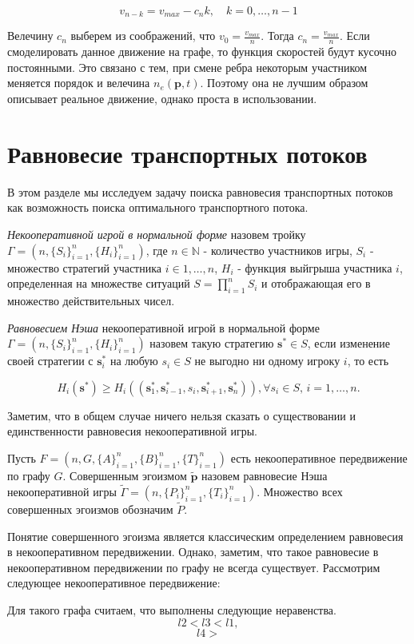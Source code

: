 \documentclass[12pt, a4paper]{article}
\begin{document}
$$v_{n - k} = v_{max} - c_n k, \quad k = 0, \dots, n - 1$$

Велечину $c_n$ выберем из соображений, что $v_0 = \frac{v_{max}}{n}$. Тогда $c_n = \frac{v_{max}}{n}$. Если смоделировать данное движение на графе, то функция скоростей будут кусочно постоянными. Это связано с тем, при смене ребра некоторым участником меняется порядок и велечина $n_e(\textbf{p}, t)$. Поэтому она не лучшим образом описывает реальное движение, однако проста в использовании.

\section{Равновесие транспортных потоков}
В этом разделе мы исследуем задачу поиска равновесия транспортных потоков как возможность поиска оптимального транспортного потока.

\textit{Некооперативной игрой в нормальной форме} назовем тройку $\Gamma = (n, \{S_i\}_{i = 1}^n, \{H_i\}_{i = 1}^n)$, где $n \in \mathbb{N}$ - количество участников игры, $S_i$ - множество стратегий участника $i \in {1, \dots, n}$, $H_i$ - функция выйгрыша участника $i$, определенная на множестве ситуаций $S = \prod\limits_{i = 1}^n S_i$ и отображающая его в множество действительных чисел.

\textit{Равновесием Нэша} некооперативной игрой в нормальной форме $\Gamma = (n, \{S_i\}_{i = 1}^n, \{H_i\}_{i = 1}^n)$ назовем такую стратегию $\textbf{s}^* \in S$, если изменение своей стратегии с $\textbf{s}_i^*$ на любую $s_i \in S$ не выгодно ни одному игроку $i$, то есть

$$H_i(\textbf{s}^*) \ge H_i(\left(\textbf{s}^*_1, \textbf{s}^*_{i - 1}, s_i, \textbf{s}^*_{i + 1}, \textbf{s}^*_{n} \right)), \forall s_i \in S, \, i = 1, \dots, n. $$ 

Заметим, что в общем случае ничего нельзя сказать о существовании и единственности равновесия некооперативной игры.

Пусть $F = (n, G, \{A\}_{i = 1}^{n}, \{B\}_{i = 1}^{n}, \{T\}_{i = 1}^{n})$ есть некооперативное передвижение по графу $G$. Совершенным эгоизмом $\widetilde{\textbf{p}}$ назовем равновесие Нэша некооперативной игры $\widetilde{\Gamma} = (n, \{P_i\}_{i = 1}^n, \{T_i\}_{i = 1}^n)$. Множество всех совершенных эгоизмов обозначим $\widetilde{P}$.

Понятие совершенного эгоизма является классическим определением равновесия в некооперативном передвижении. Однако, заметим, что такое равновесие в некооперативном передвижении по графу не всегда существует. Рассмотрим следующее некооперативное передвижение:


Для такого графа считаем, что выполнены следующие неравенства.
$$l2 < l3 < l1,$$
$$l4 > $$
\end{document}
